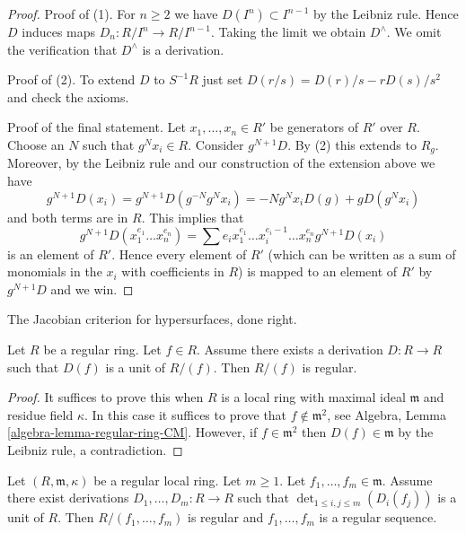\begin{proof}
Proof of (1). For $n \geq 2$ we have $D(I^n) \subset I^{n - 1}$
by the Leibniz rule. Hence $D$ induces maps $D_n : R/I^n \to R/I^{n - 1}$.
Taking the limit we obtain $D^\wedge$. We omit the verification that
$D^\wedge$ is a derivation.

\medskip\noindent
Proof of (2). To extend $D$ to $S^{-1}R$ just set
$D(r/s) = D(r)/s - rD(s)/s^2$ and check the axioms.

\medskip\noindent
Proof of the final statement. Let $x_1, \ldots, x_n \in R'$ be generators
of $R'$ over $R$. Choose an $N$ such that $g^Nx_i \in R$.
Consider $g^{N + 1}D$. By (2) this extends to $R_g$. Moreover, by
the Leibniz rule and our construction of the extension above we have
$$
g^{N + 1}D(x_i) = g^{N + 1}D(g^{-N} g^Nx_i) = -Ng^Nx_iD(g) +
gD(g^Nx_i)
$$
and both terms are in $R$. This implies that
$$
g^{N + 1}D(x_1^{e_1} \ldots x_n^{e_n}) =
\sum e_i x_1^{e_1} \ldots x_i^{e_i - 1} \ldots x_n^{e_n} g^{N + 1}D(x_i)
$$
is an element of $R'$. Hence every element of $R'$ (which can be written
as a sum of monomials in the $x_i$ with coefficients in $R$) is mapped to an
element of $R'$ by $g^{N + 1}D$ and we win.
\end{proof}

\begin{lemma}
\label{lemma-quotient-regular}
\begin{slogan}
The Jacobian criterion for hypersurfaces, done right.
\end{slogan}
Let $R$ be a regular ring. Let $f \in R$. Assume there exists a
derivation $D : R \to R$ such that $D(f)$ is a unit of $R/(f)$.
Then $R/(f)$ is regular.
\end{lemma}

\begin{proof}
It suffices to prove this when $R$ is a local ring with maximal ideal
$\mathfrak m$ and residue field $\kappa$. In this case it suffices
to prove that $f \not \in \mathfrak m^2$, see
Algebra, Lemma \ref{algebra-lemma-regular-ring-CM}.
However, if $f \in \mathfrak m^2$ then $D(f) \in \mathfrak m$
by the Leibniz rule, a contradiction.
\end{proof}

\begin{lemma}
\label{lemma-quotient-sequence-regular}
Let $(R, \mathfrak m, \kappa)$ be a regular local ring. Let $m \geq 1$. Let
$f_1, \ldots, f_m \in \mathfrak m$. Assume there exist derivations
$D_1, \ldots, D_m : R \to R$ such that
$\det_{1 \leq i, j \leq m}(D_i(f_j))$ is a unit of $R$.
Then $R/(f_1, \ldots, f_m)$ is regular and $f_1, \ldots, f_m$
is a regular sequence.
\end{lemma}

